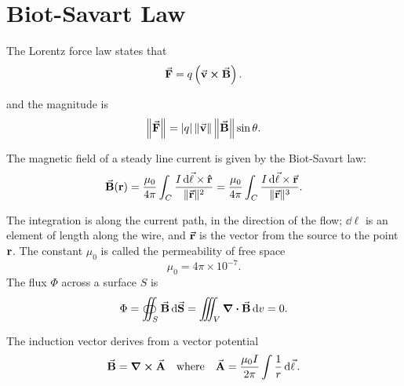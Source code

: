 \part{Biot-Savart Law}

The Lorentz force law states that
\[
	\va{F} = q\left( \va{v}\cross\va{B} \right)
	.\]

and the magnitude is
\[
	\left\|\va{F}\right\| = |q|\left\|\va{v}\right\| \left\|\va{B}\right\|\sin\theta
	.\]

The magnetic field of a steady line current is given by the Biot-Savart law:
\[
	\va{B}(\vb{r}) =  \frac{\mu_0}{4\pi}\int_{C}\frac{I \dd{\va{\ell}}\times \vu{r} }{ \| \va{r} \| ^2} = \frac{\mu_0}{4\pi}\int_{C}\frac{I \dd{\va{\ell}}\times \va{r} }{ \| \va{r} \| ^3}
	.\]

The integration is along the current path, in the direction of the flow; $\dd{\ell} $ is an element of length along the wire, and $\va{r}$ is the vector from the source to the point $\vb{r}$. The constant $\mu_0$ is called the permeability of free space
\[
	\mu_0=4\pi\times 10^{-7}
	.\]
The flux $\Phi$ across a surface $S$ is
\[
	\Phi=\oiint_S \va{B}\dd{\va{S}} = \iiint_V \div{\va{B}}\dd{v} =0
	.\]


The induction vector derives from a vector potential
\[
	\va{B}=\curl{\va{A}}\qq{where}\va{A}=\frac{\mu_0I}{2\pi}\int \frac{1}{r}\dd{\va{\ell}}
	.\]
